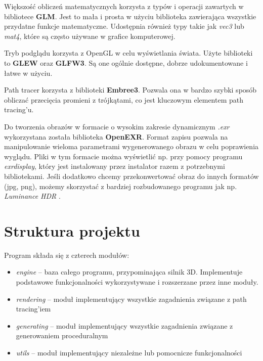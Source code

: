 \documentclass[inz,shortabstract]{iithesis}
\begin{document}
        Większość obliczeń matematycznych korzysta z typów i operacji zawartych w bibliotece \textbf{GLM}. Jest to mała i prosta w użyciu biblioteka zawierająca wszystkie przydatne funkcje matematyczne. Udostępnia również typy takie jak \textit{vec3} lub \textit{mat4}, które są często używane w grafice komputerowej. 
        
        Tryb podglądu korzysta z OpenGL w celu wyświetlania świata. Użyte biblioteki to \textbf{GLEW} oraz \textbf{GLFW3}. Są one ogólnie dostępne, dobrze udokumentowane i łatwe w użyciu. 
        
        Path tracer korzysta z biblioteki \textbf{Embree3}. Pozwala ona w bardzo szybki sposób obliczać przecięcia promieni z trójkątami, co jest kluczowym elementem path tracing'u. 
        
        Do tworzenia obrazów w formacie o wysokim zakresie dynamicznym \textit{.exr} wykorzystana została biblioteka \textbf{OpenEXR}. Format zapisu pozwala na manipulowanie wieloma parametrami wygenerowanego obrazu w celu poprawienia wyglądu. 
        Pliki w tym formacie można wyświetlić np. przy pomocy programu \textit{exrdisplay}, który jest instalowany przez instalator razem z potrzebnymi bibliotekami. Jeśli dodatkowo chcemy przekonwertować obraz do innych formatów (jpg, png), możemy skorzystać z bardziej rozbudowanego programu jak np. \textit{Luminance HDR} \cite{luminanceHDR}.  
        \vfill
        
    \section{Struktura projektu}
        Program składa się z czterech modułów:
        \begin{itemize}
            \item \textit{engine} -- baza całego programu, przypominająca silnik 3D. Implementuje podstawowe funkcjonalności wykorzystywane i rozszerzane przez inne moduły. 
            \item \textit{rendering} -- moduł implementujący wszystkie zagadnienia związane z path tracing'iem
            \item \textit{generating} -- moduł implementujący wszystkie zagadnienia związane z generowaniem proceduralnym
            \item \textit{utils} -- moduł implementujący niezależne lub pomocnicze funkcjonalności
        \end{itemize}
        
\end{document}
